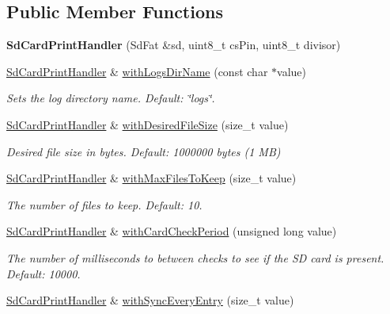 \subsection*{Public Member Functions}
\begin{DoxyCompactItemize}
\item 
\mbox{\label{class_sd_card_print_handler_a1e9332a9b5a9a5a93a89d55dc8ee8c56}} 
{\bfseries Sd\+Card\+Print\+Handler} (Sd\+Fat \&sd, uint8\+\_\+t cs\+Pin, uint8\+\_\+t divisor)
\item 
\mbox{\hyperlink{class_sd_card_print_handler}{Sd\+Card\+Print\+Handler}} \& \mbox{\hyperlink{class_sd_card_print_handler_aac9a7f9d1a22db39acfc17c4a61c9419}{with\+Logs\+Dir\+Name}} (const char $\ast$value)
\begin{DoxyCompactList}\small\item\em Sets the log directory name. Default\+: \char`\"{}logs\char`\"{}. \end{DoxyCompactList}\item 
\mbox{\hyperlink{class_sd_card_print_handler}{Sd\+Card\+Print\+Handler}} \& \mbox{\hyperlink{class_sd_card_print_handler_a72ba4425d0d1551a2ad4513f2bfaefa5}{with\+Desired\+File\+Size}} (size\+\_\+t value)
\begin{DoxyCompactList}\small\item\em Desired file size in bytes. Default\+: 1000000 bytes (1 MB) \end{DoxyCompactList}\item 
\mbox{\hyperlink{class_sd_card_print_handler}{Sd\+Card\+Print\+Handler}} \& \mbox{\hyperlink{class_sd_card_print_handler_a8b0884db89c62250822641cde11a5abc}{with\+Max\+Files\+To\+Keep}} (size\+\_\+t value)
\begin{DoxyCompactList}\small\item\em The number of files to keep. Default\+: 10. \end{DoxyCompactList}\item 
\mbox{\hyperlink{class_sd_card_print_handler}{Sd\+Card\+Print\+Handler}} \& \mbox{\hyperlink{class_sd_card_print_handler_a0ddcaed71e575f70e5a5240cd5765002}{with\+Card\+Check\+Period}} (unsigned long value)
\begin{DoxyCompactList}\small\item\em The number of milliseconds to between checks to see if the SD card is present. Default\+: 10000. \end{DoxyCompactList}\item 
\mbox{\hyperlink{class_sd_card_print_handler}{Sd\+Card\+Print\+Handler}} \& \mbox{\hyperlink{class_sd_card_print_handler_a9172a9620d575738e1387005e16759f9}{with\+Sync\+Every\+Entry}} (size\+\_\+t value)

\end{DoxyCompactItemize}
